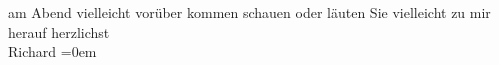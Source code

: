 \begin{ledgroupsized}[t]{13cm}
               am Abend {\pb}vielleicht vorüber kommen
               schauen oder läuten Sie vielleicht zu mir herauf\pend
           \pstart
           herzlichst{\\[\baselineskip]}\spacefill\mbox{Richard}\pend
           \leftskip=0em{}\pstart
           \centering{}\label{T_L00421_1v}\label{T_L00421_1h}\pend
           
         
         \endnumbering{}\end{ledgroupsized}  \newcommand{\dateiname}{L00421}\newcommand{\titel}{Richard Beer-Hofmann an Arthur Schnitzler, [17. 2. 1895?]}\newcommand{\editorInnen}{Martin Anton Müller und Gerd-Hermann Susen}
      